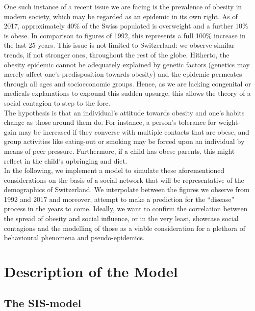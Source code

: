 \documentclass[11pt]{article}
\begin{document}
One such instance of a recent issue we are facing is the prevalence of obesity in modern society, which may be regarded as an epidemic in its own right. As of 2017, approximately 40\% of the Swiss populated is overweight and a further 10\% is obese. In comparison to figures of 1992, this represents a full 100\% increase in the last 25 years\cite{bmistatistics}. This issue is not limited to Switzerland: we observe similar trends, if not stronger ones, throughout the rest of the globe. Hitherto, the obesity epidemic cannot be adequately explained by genetic factors (genetics may merely affect one’s predisposition towards obesity)\cite{spreadOfObesityPaper} and the epidemic permeates through all ages and socioeconomic groups.
Hence, as we are lacking congenital or medicals explanations to expound this sudden upsurge, this allows the theory of a social contagion to step to the fore.\\

The hypothesis is that an individual’s attitude towards obesity and one’s habits change as those around them do. For instance, a person’s tolerance for weight-gain may be increased if they converse with multiple contacts that are obese, and group activities like eating-out or smoking may be forced upon an individual by means of peer pressure. Furthermore, if a child has obese parents, this might reflect in the child’s upbringing and diet.\\

In the following, we implement a model to simulate these aforementioned considerations on the basis of a social network that will be representative of the demographics of Switzerland. We interpolate between the figures we observe from 1992 and 2017 and moreover, attempt to make a prediction for the “disease” process in the years to come. Ideally, we want to confirm the correlation between the spread of obesity and social influence, or in the very least, showcase social contagions and the modelling of those as a viable consideration for a plethora of behavioural phenomena and pseudo-epidemics.

\section{Description of the Model}

\subsection{The SIS-model}
\end{document}
